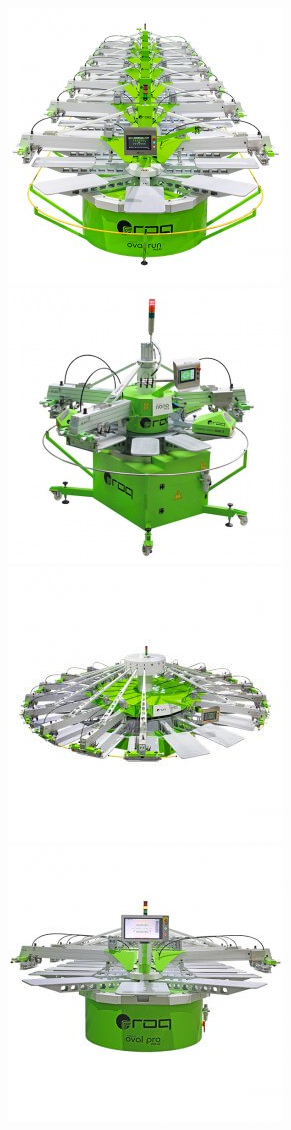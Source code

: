 {\begin{figure}[ht]
\begin{center}
\includegraphics[scale=0.5]{"./image/ROQ/maquinas/EVO-600x600-275x275.jpg"}
\includegraphics[scale=0.5]{"./image/ROQ/maquinas/nanop10-275x275.jpg"}
\includegraphics[scale=0.5]{"./image/ROQ/maquinas/NEXTP18-600x6001-275x275.jpg"}
\includegraphics[scale=0.5]{"./image/ROQ/maquinas/PRO-600x600-275x275.jpg"}

\end{center}
\end{figure}}
